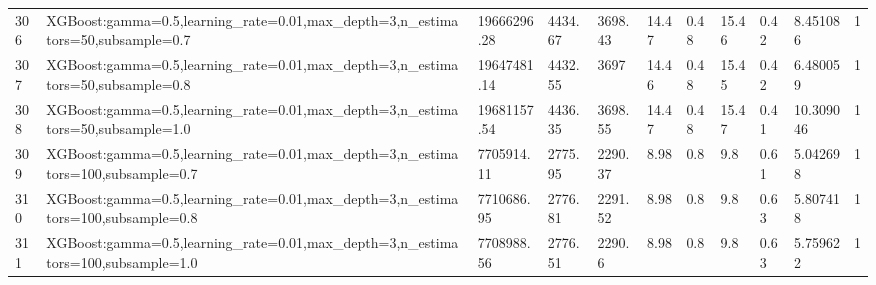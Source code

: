 \begin{longtable}{C{0.8cm} L{2cm} C{1.15cm} C{1.15cm} C{1.15cm} C{1.15cm} C{0.85cm} C{1.25cm} C{1.2cm} C{1.5cm} C{1.0cm}}
306 & XGBoost:\newline gamma=0.5,\newline learning\_rate=0.01,\newline max\_depth=3,\newline n\_estimators=50,\newline subsample=0.7 & 19666296.28 & 4434.67 & 3698.43 & 14.47 & 0.48 & 15.46 & 0.42 & 8.451086 & 1 \\
307 & XGBoost:\newline gamma=0.5,\newline learning\_rate=0.01,\newline max\_depth=3,\newline n\_estimators=50,\newline subsample=0.8 & 19647481.14 & 4432.55 & 3697 & 14.46 & 0.48 & 15.45 & 0.42 & 6.480059 & 1 \\
308 & XGBoost:\newline gamma=0.5,\newline learning\_rate=0.01,\newline max\_depth=3,\newline n\_estimators=50,\newline subsample=1.0 & 19681157.54 & 4436.35 & 3698.55 & 14.47 & 0.48 & 15.47 & 0.41 & 10.309046 & 1 \\
309 & XGBoost:\newline gamma=0.5,\newline learning\_rate=0.01,\newline max\_depth=3,\newline n\_estimators=100,\newline subsample=0.7 & 7705914.11 & 2775.95 & 2290.37 & 8.98 & 0.8 & 9.8 & 0.61 & 5.042698 & 1 \\
310 & XGBoost:\newline gamma=0.5,\newline learning\_rate=0.01,\newline max\_depth=3,\newline n\_estimators=100,\newline subsample=0.8 & 7710686.95 & 2776.81 & 2291.52 & 8.98 & 0.8 & 9.8 & 0.63 & 5.807418 & 1 \\
311 & XGBoost:\newline gamma=0.5,\newline learning\_rate=0.01,\newline max\_depth=3,\newline n\_estimators=100,\newline subsample=1.0 & 7708988.56 & 2776.51 & 2290.6 & 8.98 & 0.8 & 9.8 & 0.63 & 5.759622 & 1 \\

\end{longtable}
